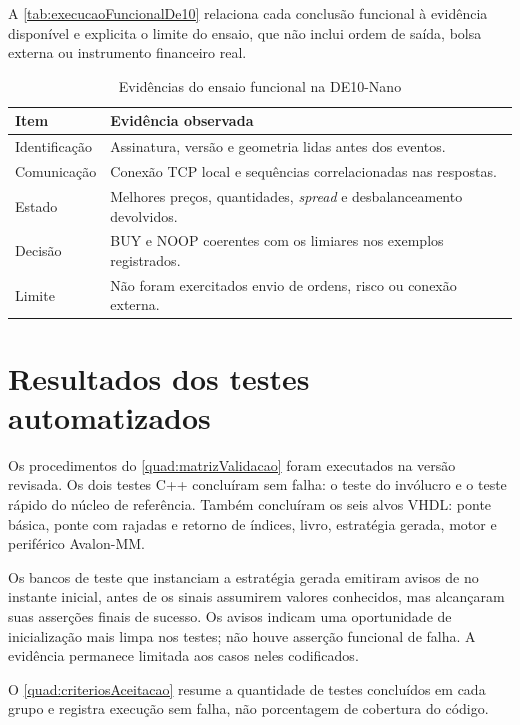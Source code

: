 A \autoref{tab:execucaoFuncionalDe10} relaciona cada conclusão funcional à evidência disponível e explicita o limite do ensaio, que não inclui ordem de saída, bolsa externa ou instrumento financeiro real.

\begin{table}[htb]
\caption{Evidências do ensaio funcional na DE10-Nano}
\label{tab:execucaoFuncionalDe10}
\begin{tabularx}{\textwidth}{lX}
\toprule
\textbf{Item} & \textbf{Evidência observada} \\ \midrule
Identificação & Assinatura, versão e geometria lidas antes dos eventos. \\
Comunicação & Conexão TCP local e sequências correlacionadas nas respostas. \\
Estado & Melhores preços, quantidades, \textit{spread} e desbalanceamento devolvidos. \\
Decisão & BUY e NOOP coerentes com os limiares nos exemplos registrados. \\
Limite & Não foram exercitados envio de ordens, risco ou conexão externa. \\ \bottomrule
\end{tabularx}
\end{table}

\section{Resultados dos testes automatizados}\label{sec:validacaoTestes}

Os procedimentos do \autoref{quad:matrizValidacao} foram executados na versão revisada. Os dois testes C++ concluíram sem falha: o teste do invólucro e o teste rápido do núcleo de referência. Também concluíram os seis alvos VHDL: ponte básica, ponte com rajadas e retorno de índices, livro, estratégia gerada, motor e periférico Avalon-MM.

Os bancos de teste que instanciam a estratégia gerada emitiram avisos de  no instante inicial, antes de os sinais assumirem valores conhecidos, mas alcançaram suas asserções finais de sucesso. Os avisos indicam uma oportunidade de inicialização mais limpa nos testes; não houve asserção funcional de falha. A evidência permanece limitada aos casos neles codificados.

O \autoref{quad:criteriosAceitacao} resume a quantidade de testes concluídos em cada grupo e registra execução sem falha, não porcentagem de cobertura do código.

